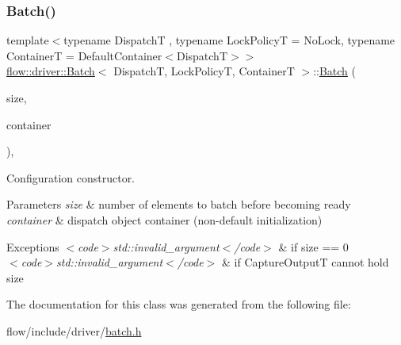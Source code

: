 \subsubsection{\texorpdfstring{Batch()}{Batch()}\hspace{0.1cm}{\footnotesize\ttfamily [2/2]}}
{\footnotesize\ttfamily template$<$typename DispatchT , typename Lock\+PolicyT  = No\+Lock, typename ContainerT  = Default\+Container$<$\+Dispatch\+T$>$$>$ \\
\hyperlink{classflow_1_1driver_1_1_batch}{flow\+::driver\+::\+Batch}$<$ DispatchT, Lock\+PolicyT, ContainerT $>$\+::\hyperlink{classflow_1_1driver_1_1_batch}{Batch} (\begin{DoxyParamCaption}\item[{const \hyperlink{classflow_1_1driver_1_1_batch_aa2930228e4fd0f1231a89a5224ae2a0a}{size\+\_\+type}}]{size,  }\item[{const ContainerT \&}]{container }\end{DoxyParamCaption})\hspace{0.3cm}{\ttfamily [explicit]}, {\ttfamily [noexcept]}}



Configuration constructor. 


\begin{DoxyParams}{Parameters}
{\em size} & number of elements to batch before becoming ready \\
\hline
{\em container} & dispatch object container (non-\/default initialization)\\
\hline
\end{DoxyParams}

\begin{DoxyExceptions}{Exceptions}
{\em $<$code$>$std\+::invalid\+\_\+argument$<$/code$>$} & if {\ttfamily size == 0} \\
\hline
{\em $<$code$>$std\+::invalid\+\_\+argument$<$/code$>$} & if {\ttfamily Capture\+OutputT} cannot hold {\ttfamily size} \\
\hline
\end{DoxyExceptions}


The documentation for this class was generated from the following file\+:\begin{DoxyCompactItemize}
\item 
flow/include/driver/\hyperlink{batch_8h}{batch.\+h}\end{DoxyCompactItemize}
